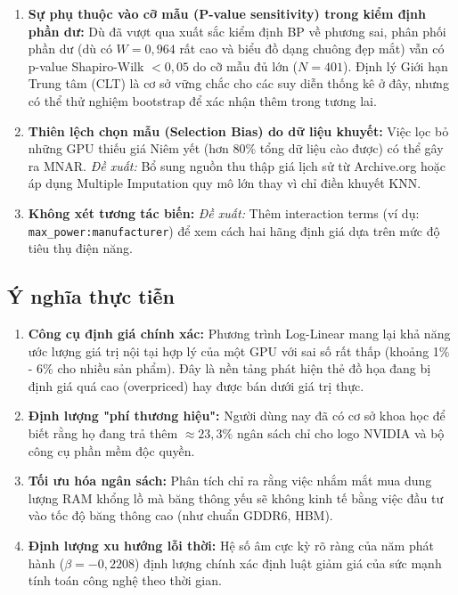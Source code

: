\begin{enumerate}
  \item \textbf{Sự phụ thuộc vào cỡ mẫu (P-value sensitivity) trong kiểm định phần dư:} Dù đã vượt qua xuất sắc kiểm định BP về phương sai, phân phối phần dư (dù có $W = 0{,}964$ rất cao và biểu đồ dạng chuông đẹp mắt) vẫn có p-value Shapiro-Wilk $< 0{,}05$ do cỡ mẫu đủ lớn ($N=401$). Định lý Giới hạn Trung tâm (CLT) là cơ sở vững chắc cho các suy diễn thống kê ở đây, nhưng có thể thử nghiệm bootstrap để xác nhận thêm trong tương lai.
  \item \textbf{Thiên lệch chọn mẫu (Selection Bias) do dữ liệu khuyết:} Việc lọc bỏ những GPU thiếu giá Niêm yết (hơn 80\% tổng dữ liệu cào được) có thể gây ra MNAR. \textit{Đề xuất:} Bổ sung nguồn thu thập giá lịch sử từ Archive.org hoặc áp dụng Multiple Imputation quy mô lớn thay vì chỉ điền khuyết KNN.
  \item \textbf{Không xét tương tác biến:} \textit{Đề xuất:} Thêm interaction terms (ví dụ: \texttt{max\_power:manufacturer}) để xem cách hai hãng định giá dựa trên mức độ tiêu thụ điện năng.
\end{enumerate}

\subsection{Ý nghĩa thực tiễn}

\begin{enumerate}
  \item \textbf{Công cụ định giá chính xác:} Phương trình Log-Linear mang lại khả năng ước lượng giá trị nội tại hợp lý của một GPU với sai số rất thấp (khoảng 1\% - 6\% cho nhiều sản phẩm). Đây là nền tảng phát hiện thẻ đồ họa đang bị định giá quá cao (overpriced) hay được bán dưới giá trị thực.
  \item \textbf{Định lượng "phí thương hiệu":} Người dùng nay đã có cơ sở khoa học để biết rằng họ đang trả thêm $\approx 23{,}3\%$ ngân sách chỉ cho logo NVIDIA và bộ công cụ phần mềm độc quyền.
  \item \textbf{Tối ưu hóa ngân sách:} Phân tích chỉ ra rằng việc nhắm mắt mua dung lượng RAM khổng lồ mà băng thông yếu sẽ không kinh tế bằng việc đầu tư vào tốc độ băng thông cao (như chuẩn GDDR6, HBM).
  \item \textbf{Định lượng xu hướng lỗi thời:} Hệ số âm cực kỳ rõ ràng của năm phát hành ($\beta = -0{,}2208$) định lượng chính xác định luật giảm giá của sức mạnh tính toán công nghệ theo thời gian.
\end{enumerate}

